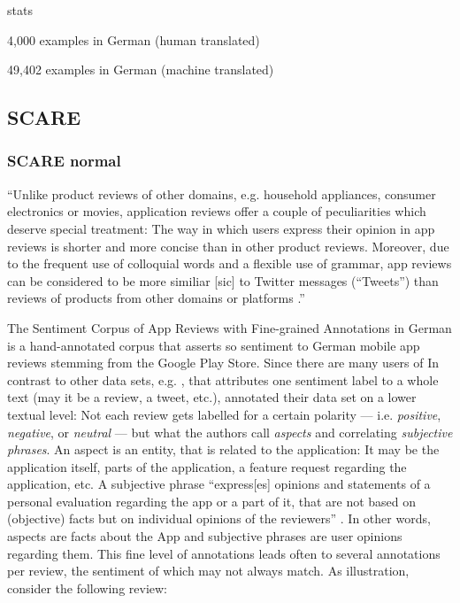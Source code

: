 stats

4,000 examples in German (human translated)

49,402 examples in German (machine translated)



\subsection{SCARE}

\subsubsection{SCARE normal}

``Unlike product reviews of other domains, e.g. household appliances, consumer electronics or movies, application reviews offer a couple of peculiarities which deserve special treatment:
The way in which users express their opinion in app reviews is shorter and more concise than in other product reviews.
Moreover, due to the frequent use of colloquial words and a flexible use of grammar, app reviews can be considered to be more similiar [sic] to Twitter messages (“Tweets”) than reviews of products from other domains or platforms \textelp{}.'' \citep[p.~1114]{sanger2016scare}


The Sentiment Corpus of App Reviews with Fine-grained Annotations in German \cite{sanger2016scare} is a hand-annotated corpus that asserts so sentiment to German mobile app reviews stemming from the Google Play Store.
Since there are many users of 
In contrast to other data sets, e.g. \citep{socher2013recursive, go2009twitter}, that attributes one sentiment label to a whole text (may it be a review, a tweet, etc.), \cite{sanger2016scare} annotated their data set on a lower textual level:
Not each review gets labelled for a certain polarity --- i.e. \emph{positive}, \emph{negative}, or \emph{neutral} --- but what the authors call \emph{aspects} and correlating \emph{subjective phrases}.
An aspect is an entity, that is related to the application:
It may be the application itself, parts of the application, a feature request regarding the application, etc.
A subjective phrase ``express[es] opinions and statements of a personal evaluation regarding the app or a part of it, that are not based on (objective) facts but on individual opinions of the reviewers'' \citep[p.~1116]{sanger2016scare}.
In other words, aspects are facts about the App and subjective phrases are user opinions regarding them.
This fine level of annotations leads often to several annotations per review, the sentiment of which may not always match.
As illustration, consider the following review:

